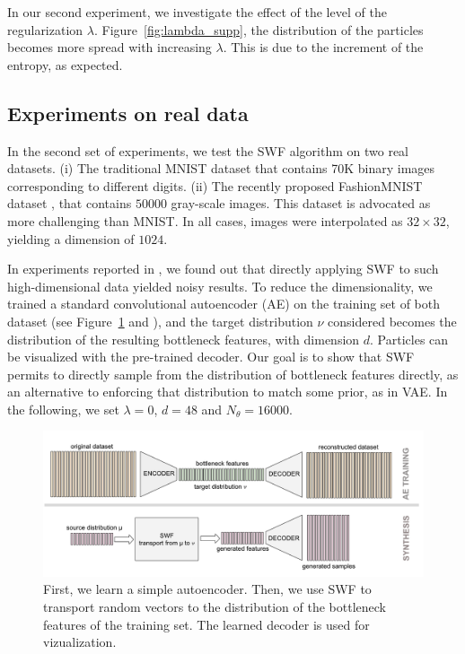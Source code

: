 

In our second experiment, we investigate the effect of the level of the regularization $\lambda$. Figure~\ref{fig:lambda_supp}, the distribution of the particles becomes more spread with increasing $\lambda$. This is due to the increment of the entropy, as expected.

\subsection{Experiments on real data}

In the second set of experiments, we test the SWF algorithm on two real datasets. (i) The traditional MNIST dataset that contains 70K binary images corresponding to different digits. (ii) The recently proposed FashionMNIST dataset \cite{xiao2017fashion}, that contains $50000$ gray-scale images. This dataset is advocated as more challenging than MNIST. In all cases, images were interpolated as $32\times 32$, yielding a dimension of $1024$.

In experiments reported in \supp, we found out that directly applying SWF to such high-dimensional data yielded noisy results. To reduce the dimensionality, we trained a standard convolutional autoencoder (AE) on the training set of both dataset (see Figure~\ref{fig:using_ae} and \supp), and the target distribution $\nu$ considered becomes the distribution of the resulting bottleneck features,
with dimension $d$. Particles can be visualized with the pre-trained decoder.
Our goal is to show that SWF permits to directly sample from the distribution of bottleneck features directly, as an alternative to enforcing that distribution to match some prior, as in VAE. In the following, we set $\lambda=0$, $d=48$ and $N_\theta=16000$.

\begin{figure}
\centering
\includegraphics[width=0.99\columnwidth]{figures/generating_bottleneck_features.pdf}
\caption{First, we learn a simple autoencoder. Then, we use SWF to transport random vectors to the distribution of the bottleneck features of the training set. The learned decoder is used for vizualization.}
\label{fig:using_ae}
\vspace{-10pt}
\end{figure}


